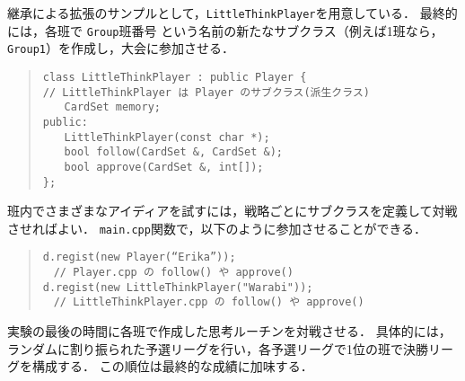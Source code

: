 継承による拡張のサンプルとして，\verb+LittleThinkPlayer+を用意している．
最終的には，各班で \verb+Group+班番号 という名前の新たなサブクラス（例えば1班なら，\verb+Group1+）を作成し，大会に参加させる．
\begin{quote}
\begin{verbatim}
class LittleThinkPlayer : public Player {
// LittleThinkPlayer は Player のサブクラス(派生クラス)
　　CardSet memory;
public:
　　LittleThinkPlayer(const char *);
　　bool follow(CardSet &, CardSet &);
　　bool approve(CardSet &, int[]);
};
\end{verbatim}
\end{quote}
班内でさまざまなアイディアを試すには，戦略ごとにサブクラスを定義して対戦させればよい．
\verb+main.cpp+関数で，以下のように参加させることができる．
\begin{quote}
\begin{verbatim}
d.regist(new Player(“Erika”)); 　
　// Player.cpp の follow() や approve() 
d.regist(new LittleThinkPlayer("Warabi")); 
　// LittleThinkPlayer.cpp の follow() や approve() 
\end{verbatim}
\end{quote}

実験の最後の時間に各班で作成した思考ルーチンを対戦させる．
具体的には，ランダムに割り振られた予選リーグを行い，各予選リーグで1位の班で決勝リーグを構成する．
この順位は最終的な成績に加味する．

